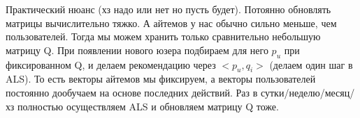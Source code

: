 Практический нюанс (хз надо или нет но пусть будет). Потоянно обновлять матрицы вычислительно тяжко. А айтемов у нас обычно сильно меньше, чем пользователей. Тогда мы можем хранить только сравнительно небольшую матрицу Q. При появлении нового юзера подбираем для него $p_{u}$ при фиксированном Q, и делаем рекомендацию через $<p_{u}, q_{i}>$ (делаем один шаг в ALS).  То есть векторы айтемов мы фиксируем, а векторы пользователей постоянно дообучаем на основе последних действий. Раз в сутки/неделю/месяц/хз полностью осуществляем ALS и обновляем матрицу Q тоже. 
